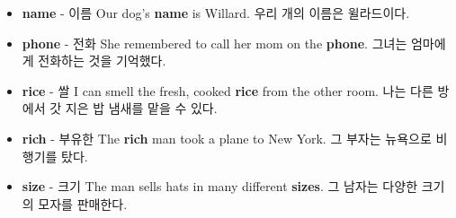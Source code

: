 \documentclass{article}
\begin{document}
\begin{addmargin}[1em]{1em}
\begin{itemize}
        \item \fontsize{12pt}{14pt}\selectfont \textbf{name} - 이름 \newline
        Our dog's \textbf{name} is Willard. \newline
        우리 개의 이름은 윌라드이다.
        
        \item \fontsize{12pt}{14pt}\selectfont \textbf{phone} - 전화 \newline
        She remembered to call her mom on the \textbf{phone}. \newline
        그녀는 엄마에게 전화하는 것을 기억했다.
        
        \item \fontsize{12pt}{14pt}\selectfont \textbf{rice} - 쌀 \newline
        I can smell the fresh, cooked \textbf{rice} from the other room. \newline
        나는 다른 방에서 갓 지은 밥 냄새를 맡을 수 있다.

        \item \fontsize{12pt}{14pt}\selectfont \textbf{rich} - 부유한 \newline
        The \textbf{rich} man took a plane to New York. \newline
        그 부자는 뉴욕으로 비행기를 탔다.
        
        \item \fontsize{12pt}{14pt}\selectfont \textbf{size} - 크기 \newline
        The man sells hats in many different \textbf{sizes}. \newline
        그 남자는 다양한 크기의 모자를 판매한다.
    \end{itemize}
\end{addmargin}

\newpage

\end{document}

